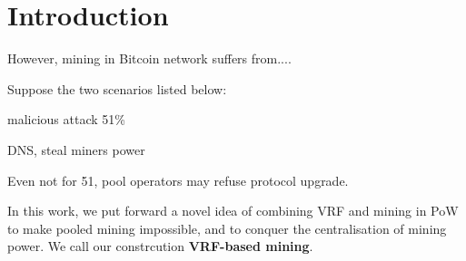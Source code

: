 \section{Introduction}




However, mining in Bitcoin network suffers from....




Suppose the two scenarios listed below:



malicious attack
51\%

DNS, steal miners power


Even not for 51, 
pool operators may refuse protocol upgrade. 


In this work, we put forward a novel idea of combining VRF and mining in PoW to make pooled mining impossible, and to conquer the centralisation of mining power.
We call our constrcution \textbf{VRF-based mining}.